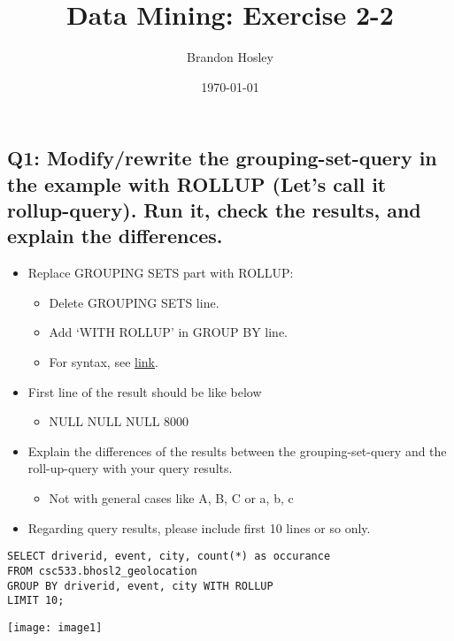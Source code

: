 \documentclass[]{article}
\title{Data Mining: Exercise 2-2}
\author{Brandon Hosley}
\date{\today}
\begin{document}
\maketitle


\subsection*{Q1: Modify/rewrite the grouping-set-query in the example with ROLLUP (Let’s call it rollup-query). Run it, check the results, and explain the differences.}

\begin{itemize}[before=\itshape,font=\normalfont]
	\setlength\itemsep{0.5em}
	\item Replace GROUPING SETS part with ROLLUP:
	\begin{itemize}
		\item Delete GROUPING SETS line.
		\item Add ‘WITH ROLLUP’ in GROUP BY line.
		\item For syntax, see \href{https://cwiki.apache.org/confluence/display/Hive/Enhanced+Aggregation\%2C+Cube\%2C+Grouping+and+Rollup}{link}.
	\end{itemize}
	\item First line of the result should be like below
	\begin{itemize}
		\item NULL NULL NULL 8000
	\end{itemize}
	\item Explain the differences of the results between the grouping-set-query and the roll-up-query with your query results. 
	\begin{itemize}
		\item Not with general cases like A, B, C or a, b, c 
	\end{itemize}
	\item Regarding query results, please include first 10 lines or so only.
\end{itemize}

\begin{verbatim}
SELECT driverid, event, city, count(*) as occurance
FROM csc533.bhosl2_geolocation
GROUP BY driverid, event, city WITH ROLLUP
LIMIT 10;
\end{verbatim}

\texttt{[image: image1]}
\end{document}
